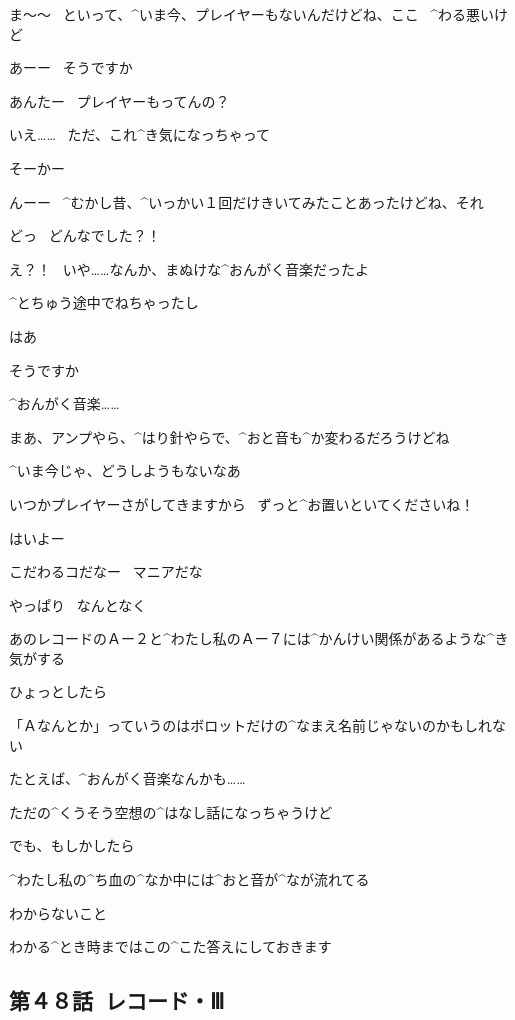 \page
\Person ま〜〜
\ といって、^{いま}{今}、プレイヤーもないんだけどね、ここ
\ ^{わる}{悪}いけど

\Kokone あーー
\ そうですか

\Person あんたー
\ プレイヤーもってんの？

\Kokone いえ……
\ ただ、これ^{き}{気}になっちゃって

\page
\Person そーかー

\Person んーー
\ ^{むかし}{昔}、^{いっかい}{１回}だけきいてみたことあったけどね、それ

\Kokone どっ
\ どんなでした？！

\Person え？！
\ いや……なんか、まぬけな^{おんがく}{音楽}だったよ

\Person ^{とちゅう}{途中}でねちゃったし

\Kokone はあ

\Kokone そうですか

\Kokone ^{おんがく}{音楽}……

\page
\Person まあ、アンプやら、^{はり}{針}やらで、^{おと}{音}も^{か}{変}わるだろうけどね

\Person ^{いま}{今}じゃ、どうしようもないなあ

\Kokone いつかプレイヤーさがしてきますから
\ ずっと^{お}{置}いといてくださいね！

\Person はいよー

\Person こだわるコだなー
\ マニアだな

\page
\Kokone やっぱり
\ なんとなく

\Kokone あのレコードのＡー２と^{わたし}{私}のＡー７には^{かんけい}{関係}があるような^{き}{気}がする

\page
\Kokone ひょっとしたら

\Kokone 「Ａなんとか」っていうのはボロットだけの^{なまえ}{名前}じゃないのかもしれない

\Kokone たとえば、^{おんがく}{音楽}なんかも……

\page
\Kokone ただの^{くうそう}{空想}の^{はなし}{話}になっちゃうけど

\Kokone でも、もしかしたら

\Kokone ^{わたし}{私}の^{ち}{血}の^{なか}{中}には^{おと}{音}が^{なが}{流}れてる

\page[64]
\Kokone わからないこと

\Kokone わかる^{とき}{時}まではこの^{こた}{答}えにしておきます


\subsection{第４８話\ レコード・Ⅲ}

